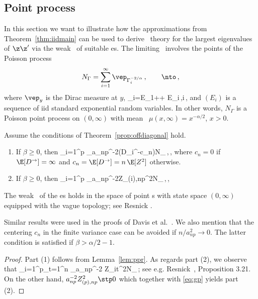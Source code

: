 \subsection{Point process \con }\label{sec:ppconvergence}
In this section we want to illustrate how the approximations from Theorem~\ref{thm:iidmain} can be used
to derive \asy\ theory for the largest eigenvalues of $\z\z'$ via the weak \con\ of suitable \pp es.
The limiting \pp\ involves the points of the Poisson process
\begin{equation}\label{eq:N}
N_\Gamma=\sum_{i=1}^\infty \vep_{\Gamma_i^{-2/\alpha}}\,,\qquad \nto\,,
\end{equation}
where $\vep_y$ is the Dirac measure at $y$, 
\beao%
\Gamma_i=E_1+\cdots + E_i\,,\qquad i\,,
\eeao
and $(E_i)$ is a sequence of iid standard exponential random variables. In other words, $N_\Gamma$ is a Poisson point process on $(0,\infty)$ with mean \ms\
$\mu(x,\infty)= x^{-\alpha/2}$, $x>0$.
\par
\begin{lemma}\label{lem:pp}
Assume the conditions of Theorem~\ref{prop:offdiagonal} hold. 
\begin{enumerate}
\item
If $\beta\ge 0$, then
\beam\label{eq:immb}
\sum_{i=1}^p \vep_{a_{np}^{-2}(D_i^\rightarrow-c_n)}\cid N_\Gamma\,,\qquad \nto\,,
\eeam  
where $c_n=0$ if $\E[D^\rightarrow]=\infty$ and $c_n=\E[D^\rightarrow]=n\,\E[Z^2]$ otherwise. 
\item
If $\beta\ge 0$, then
\beam\label{eq:imma}
\sum_{i=1}^p \vep_{a_{np}^{-2}Z_{(i),np}^2}\cid N_\Gamma\,,\qquad \nto\,,
\eeam  
\end{enumerate}
The weak \con\ of the \pp es holds in the space of 
point \ms s with state space $(0,\infty)$ equipped with the vague topology; see Resnick \cite{resnick:2007}.
\end{lemma}
\begin{remark} \rm
Similar results were used in the proofs of Davis et al.~\cite{davis:mikosch:heiny:xie:2015,davis:mikosch:pfaffel:2016}.
We also mention that the centering $c_n$ in the finite variance case can be avoided if $n/a_{np}^2\to 0$. 
The latter condition is satisfied if $\beta>\alpha/2-1$.
\end{remark}
\begin{proof} 
Part (1) follows from Lemma~\ref{lem:ppr}. As regards part (2), we observe that
\beam\label{eq:gp}
\sum_{i=1}^p\sum_{t=1}^n \vep_{a_{np}^{-2} Z_{it}^2}\std N_\Gamma\,;
\eeam
see e.g. Resnick~\cite{resnick:1987}, Proposition 3.21. On the other hand, $a_{np}^{-2} Z_{(p),np}^2\stp 0$ which together with
\eqref{eq:gp} yields part (2).
\end{proof}

